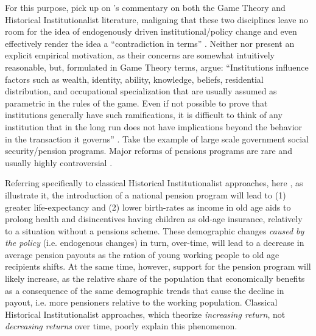 \documentclass[11pt]{article}
\begin{document}
For this purpose, \textcite[][]{Jacobs2014} pick up on \citeauthor{Greif2004}'s \parencite*{Greif2004} commentary on both the Game Theory and Historical Institutionalist literature, maligning that these two disciplines leave no room for the idea of endogenously driven institutional/policy change and even effectively render the idea a \enquote{contradiction in terms} \parencite[][p. 633]{Greif2004}. Neither \textcite[][]{Jacobs2014} nor \textcite[][]{Greif2004} present an explicit empirical motivation, as their concerns are somewhat intuitively reasonable, but, formulated in Game Theory terms, \textcite[][]{Greif2004} argue: \enquote{Institutions influence factors such as wealth, identity, ability, knowledge, beliefs, residential distribution, and occupational specialization that are usually assumed as parametric in the rules of the game. Even if not possible to prove that institutions generally have such ramifications, it is difficult to think of any institution that in the long run does not have implications beyond the behavior in the transaction it governs} \textcite[][p. 636]{Greif2004}. Take the example of large scale government social security/pension programs. Major reforms of pensions programs are rare and usually highly controversial  \parencite[see e.g. recent attempts in France to raise the retirement age][]{Leali2023}.

Referring specifically to classical Historical Institutionalist approaches, here \textcite[][]{Pierson2000}, as \textcite{Greif2004} illustrate it, the introduction of a national pension program will lead to (1) greater life-expectancy and (2) lower birth-rates as income in old age aids to prolong health and disincentives having children as old-age insurance, relatively to a situation without a pensions scheme. These demographic changes \textit{caused by the policy} (i.e. endogenous changes) in turn, over-time, will lead to a decrease in average pension payouts as the ration of young working people to old age recipients shifts. At the same time, however, support for the pension program will likely increase, as the relative share of the population that economically benefits as a consequence of the same demographic trends that cause the decline in payout, i.e. more pensioners relative to the working population. Classical Historical Institutionalist approaches, which theorize \textit{increasing return}, not \textit{decreasing returns} over time, poorly explain this phenomenon.
\end{document}

